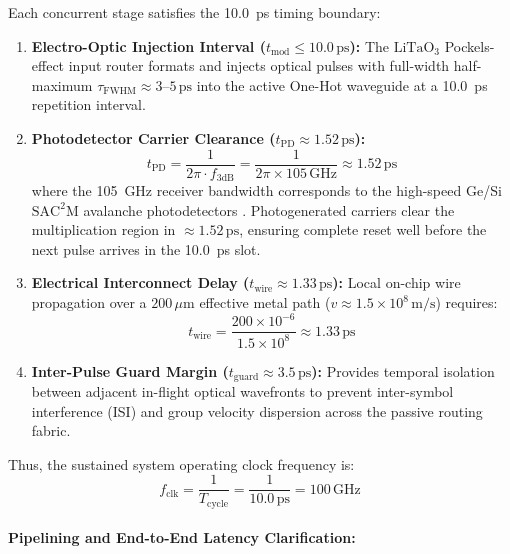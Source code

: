 \documentclass[journal]{IEEEtran}
\begin{document}
Each concurrent stage satisfies the 10.0~ps timing boundary:
\begin{enumerate}
\item \textbf{Electro-Optic Injection Interval ($t_{\text{mod}} \le 10.0\,\text{ps}$):} 
The $\mathrm{LiTaO_3}$ Pockels-effect input router formats and injects optical pulses with full-width half-maximum $\tau_{\text{FWHM}} \approx 3\text{--}5\,\text{ps}$ into the active One-Hot waveguide at a 10.0~ps repetition interval.

\item \textbf{Photodetector Carrier Clearance ($t_{\text{PD}} \approx 1.52\,\text{ps}$):}
\begin{equation*}
t_{\text{PD}} = \frac{1}{2\pi \cdot f_{3\text{dB}}} = \frac{1}{2\pi \times 105\,\text{GHz}} \approx 1.52\,\text{ps}
\end{equation*}
where the 105~GHz receiver bandwidth corresponds to the high-speed Ge/Si $\mathrm{SAC^2M}$ avalanche photodetectors \cite{Chen2025}. Photogenerated carriers clear the multiplication region in $\approx 1.52\,\text{ps}$, ensuring complete reset well before the next pulse arrives in the 10.0~ps slot.

\item \textbf{Electrical Interconnect Delay ($t_{\text{wire}} \approx 1.33\,\text{ps}$):}
Local on-chip wire propagation over a $200\,\mu\text{m}$ effective metal path ($v \approx 1.5 \times 10^8\,\text{m/s}$) requires:
\begin{equation*}
t_{\text{wire}} = \frac{200 \times 10^{-6}}{1.5 \times 10^8} \approx 1.33\,\text{ps}
\end{equation*}

\item \textbf{Inter-Pulse Guard Margin ($t_{\text{guard}} \approx 3.5\,\text{ps}$):}
Provides temporal isolation between adjacent in-flight optical wavefronts to prevent inter-symbol interference (ISI) and group velocity dispersion across the passive routing fabric.
\end{enumerate}

Thus, the sustained system operating clock frequency is:
\begin{equation}
f_{\text{clk}} = \frac{1}{T_{\text{cycle}}} = \frac{1}{10.0\,\text{ps}} = 100\,\text{GHz}
\end{equation}

\paragraph{\textbf{Pipelining and End-to-End Latency Clarification:}}
\end{document}

